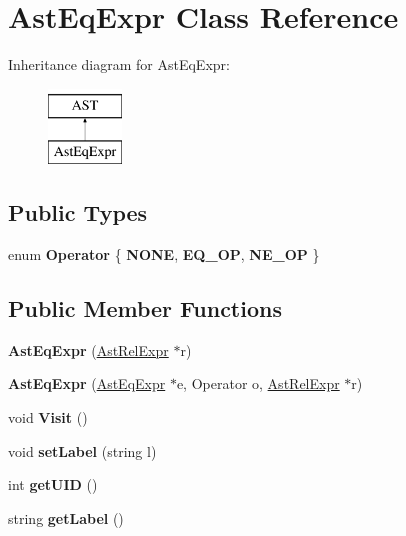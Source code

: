 \hypertarget{classAstEqExpr}{\section{Ast\-Eq\-Expr Class Reference}
\label{classAstEqExpr}
}
Inheritance diagram for Ast\-Eq\-Expr\-:\begin{figure}[H]
\begin{center}
\leavevmode
\includegraphics[height=2.000000cm]{classAstEqExpr}
\end{center}
\end{figure}
\subsection*{Public Types}
\begin{DoxyCompactItemize}
\item 
enum {\bfseries Operator} \{ {\bfseries N\-O\-N\-E}, 
{\bfseries E\-Q\-\_\-\-O\-P}, 
{\bfseries N\-E\-\_\-\-O\-P}
 \}
\end{DoxyCompactItemize}
\subsection*{Public Member Functions}
\begin{DoxyCompactItemize}
\item 
\hypertarget{classAstEqExpr_ae59f45e93845f531132980db8e8b8e2b}{{\bfseries Ast\-Eq\-Expr} (\hyperlink{classAstRelExpr}{Ast\-Rel\-Expr} $\ast$r)}\label{classAstEqExpr_ae59f45e93845f531132980db8e8b8e2b}

\item 
\hypertarget{classAstEqExpr_aac47a62e5410c55ac1f645a699e05ec4}{{\bfseries Ast\-Eq\-Expr} (\hyperlink{classAstEqExpr}{Ast\-Eq\-Expr} $\ast$e, Operator o, \hyperlink{classAstRelExpr}{Ast\-Rel\-Expr} $\ast$r)}\label{classAstEqExpr_aac47a62e5410c55ac1f645a699e05ec4}

\item 
\hypertarget{classAstEqExpr_a6e0e9e88f6801eb135efef5bb5fe2851}{void {\bfseries Visit} ()}\label{classAstEqExpr_a6e0e9e88f6801eb135efef5bb5fe2851}

\item 
\hypertarget{classAST_a71d680856e95ff89f55d5311a552eba6}{void {\bfseries set\-Label} (string l)}\label{classAST_a71d680856e95ff89f55d5311a552eba6}

\item 
\hypertarget{classAST_ab7a5b1d9f1c2de0d98deb356f724a42c}{int {\bfseries get\-U\-I\-D} ()}\label{classAST_ab7a5b1d9f1c2de0d98deb356f724a42c}

\item 
\hypertarget{classAST_aee029be902fffc927d16ccb03eb922ad}{string {\bfseries get\-Label} ()}\label{classAST_aee029be902fffc927d16ccb03eb922ad}

\end{DoxyCompactItemize}
